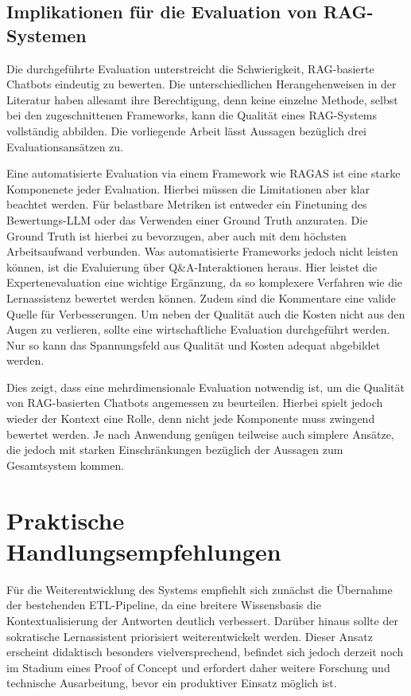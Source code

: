 \subsection{Implikationen für die Evaluation von RAG-Systemen}

Die durchgeführte Evaluation unterstreicht die Schwierigkeit, RAG-basierte Chatbots eindeutig zu bewerten.
Die unterschiedlichen Herangehenweisen in der Literatur haben allesamt ihre Berechtigung, denn keine einzelne Methode, selbst bei den zugeschnittenen Frameworks, kann die Qualität eines RAG-Systems vollständig abbilden.
Die vorliegende Arbeit lässt Aussagen bezüglich drei Evaluationsansätzen zu.

Eine automatisierte Evaluation via einem Framework wie RAGAS ist eine starke Komponenete jeder Evaluation.
Hierbei müssen die Limitationen aber klar beachtet werden.
Für belastbare Metriken ist entweder ein Finetuning des Bewertungs-LLM oder das Verwenden einer Ground Truth anzuraten.
Die Ground Truth ist hierbei zu bevorzugen, aber auch mit dem höchsten Arbeitsaufwand verbunden.
Was automatisierte Frameworks jedoch nicht leisten können, ist die Evaluierung über Q\&A-Interaktionen heraus.
Hier leistet die Expertenevaluation eine wichtige Ergänzung, da so komplexere Verfahren wie die Lernassistenz bewertet werden können.
Zudem sind die Kommentare eine valide Quelle für Verbesserungen.
Um neben der Qualität auch die Kosten nicht aus den Augen zu verlieren, sollte eine wirtschaftliche Evaluation durchgeführt werden.
Nur so kann das Spannungsfeld aus Qualität und Kosten adequat abgebildet werden.

Dies zeigt, dass eine mehrdimensionale Evaluation notwendig ist, um die Qualität von RAG-basierten Chatbots angemessen zu beurteilen.
Hierbei spielt jedoch wieder der Kontext eine Rolle, denn nicht jede Komponente muss zwingend bewertet werden.
Je nach Anwendung genügen teilweise auch simplere Ansätze, die jedoch mit starken Einschränkungen bezüglich der Aussagen zum Gesamtsystem kommen.

\section{Praktische Handlungsempfehlungen}

Für die Weiterentwicklung des Systems empfiehlt sich zunächst die Übernahme der bestehenden ETL-Pipeline, da eine breitere Wissensbasis die Kontextualisierung der Antworten deutlich verbessert.
Darüber hinaus sollte der sokratische Lernassistent priorisiert weiterentwickelt werden.
Dieser Ansatz erscheint didaktisch besonders vielversprechend, befindet sich jedoch derzeit noch im Stadium eines Proof of Concept und erfordert daher weitere Forschung und technische Ausarbeitung, bevor ein produktiver Einsatz möglich ist.

